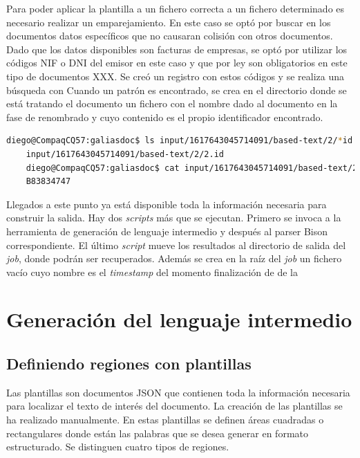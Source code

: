
Para poder aplicar la plantilla a un fichero correcta a un fichero determinado es necesario realizar un emparejamiento. En este caso se optó por buscar en los documentos datos específicos que no causaran colisión con otros documentos. Dado que los datos disponibles son facturas de empresas, se optó por utilizar los códigos NIF o DNI del emisor en este caso y que por ley son obligatorios en este tipo de documentos XXX. Se creó un registro con estos códigos y se realiza una búsqueda con %
Cuando un patrón es encontrado, se crea en el directorio donde se está tratando el documento un fichero con el nombre dado al documento en la fase de renombrado y cuyo contenido es el propio identificador encontrado.

\begin{lstlisting}[language=bash,caption={Identificador del documento},label=lst:identificador-documento]
    diego@CompaqCQ57:galiasdoc$ ls input/1617643045714091/based-text/2/*id
    input/1617643045714091/based-text/2/2.id
    diego@CompaqCQ57:galiasdoc$ cat input/1617643045714091/based-text/2/*id
    B83834747
\end{lstlisting}

Llegados a este punto ya está disponible toda la información necesaria para construir la salida. Hay dos \emph{scripts} más que se ejecutan. Primero se invoca a la herramienta de generación de lenguaje intermedio y después al parser Bison correspondiente. El último \emph{script} mueve los resultados al directorio de salida del \emph{job}, donde podrán ser recuperados. Además se crea en la raíz del \emph{job} un fichero vacío cuyo nombre es el \emph{timestamp} del momento finalización de de la %

\section{Generación del lenguaje intermedio}

\subsection{Definiendo regiones con plantillas}

Las plantillas son documentos JSON que contienen toda la información necesaria para localizar el texto de interés del documento. La creación de las plantillas se ha realizado manualmente. En estas plantillas se definen áreas cuadradas o rectangulares donde están las palabras que se desea generar en formato estructurado. Se distinguen cuatro tipos de regiones.

